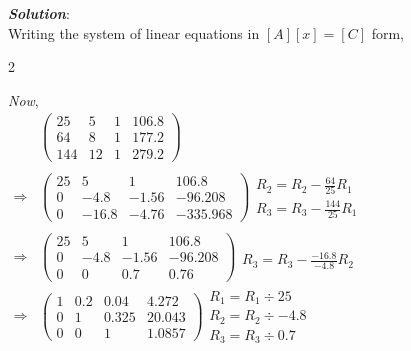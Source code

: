\textbf{\textit{Solution}}:\\[0.5em]
Writing the system of linear equations in $[A][x]=[C]$ form,

\begin{multicols}{2}
\noindent
\raggedcolumns

\textit{Now},\\[0.5em]
$\begin{aligned}
&
\left(
\begin{array}{ccc|c}
25 & 5 & 1 & 106.8 \\
64 & 8 & 1 & 177.2 \\
144 & 12 & 1 & 279.2
\end{array}
\right)
\begin{array}{l}
\end{array}\\ 
\Rightarrow &
\left(
\begin{array}{ccc|c}
25 & 5 & 1 & 106.8 \\
0 & -4.8 & -1.56 & -96.208 \\
0 & -16.8 & -4.76 & -335.968
\end{array}
\right)
\begin{array}{l}
\\
R_2=R_2 - \frac{64}{25}R_1\\[0.5em]
R_3=R_3 - \frac{144}{25}R_1\\
\end{array}\\
\Rightarrow &
\left(
\begin{array}{ccc|c}
25 & 5 & 1 & 106.8 \\
0 & -4.8 & -1.56 & -96.208 \\
0 & 0 & 0.7 & 0.76
\end{array}
\right)
\begin{array}{l}
\\\\
R_3=R_3 - \frac{-16.8}{-4.8}R_2\\
\end{array}\\
\Rightarrow &
\left(
\begin{array}{ccc|c}
1 & 0.2 & 0.04 & 4.272 \\
0 & 1 & 0.325 & 20.043 \\
0 & 0 & 1 & 1.0857
\end{array}
\right)
\begin{array}{l}
R_1=R_1 \div 25\\
R_2=R_2 \div -4.8\\
R_3=R_3 \div 0.7
\end{array}
\end{aligned}$


\end{multicols}
